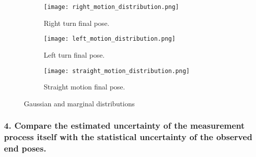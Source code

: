 \begin{figure}[H]
\centering
\begin{subfigure}[b]{0.3\textwidth}
\texttt{[image: right\_motion\_distribution.png]}
\caption{Right turn final pose.}
\label{distribution-right-turn}
\end{subfigure}
\qquad
\begin{subfigure}[b]{0.3\textwidth}
\texttt{[image: left\_motion\_distribution.png]}
\caption{Left turn final pose.}
\label{distribution-right-turn}
\end{subfigure}
\qquad
\begin{subfigure}[b]{0.3\textwidth}
\texttt{[image: straight\_motion\_distribution.png]}
\caption{Straight motion final pose.}
\label{distribution-straight-motion}
\end{subfigure}
\caption{Gaussian and marginal distributions }
\end{figure}

\newpage
\subsubsection*{4. Compare the estimated uncertainty of the measurement process itself with the statistical uncertainty of the observed end poses.}

